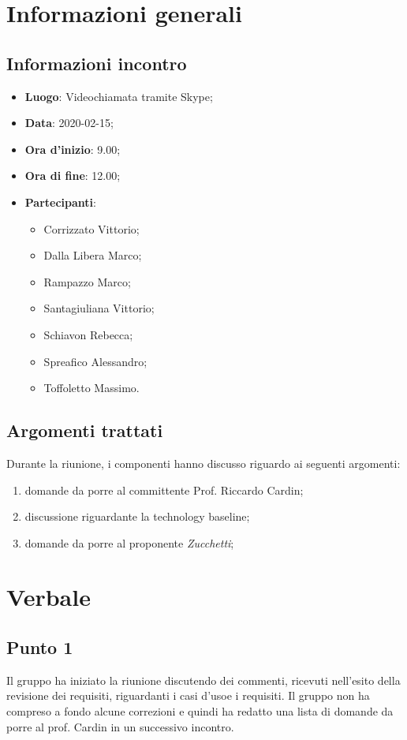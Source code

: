 \section{Informazioni generali}
    \subsection{Informazioni incontro}
        \begin{itemize}
            \item \textbf{Luogo}: Videochiamata tramite Skype;
            \item \textbf{Data}: 2020-02-15;
            \item \textbf{Ora d'inizio}: 9.00;
            \item \textbf{Ora di fine}: 12.00;
            \item \textbf{Partecipanti}: \begin{itemize}
                \item Corrizzato Vittorio;
                \item Dalla Libera Marco;
                \item Rampazzo Marco;
                \item Santagiuliana Vittorio;
                \item Schiavon Rebecca;
                \item Spreafico Alessandro;
                \item Toffoletto Massimo.
            \end{itemize}
        \end{itemize}
    \subsection{Argomenti trattati}
		Durante la riunione, i componenti hanno discusso riguardo ai seguenti argomenti:
        \begin{enumerate}
        	\item domande da porre al committente Prof. Riccardo Cardin;
        	\item discussione riguardante la technology baseline;
            \item domande da porre al proponente \textit{Zucchetti};
        \end{enumerate}
\section{Verbale}
    \subsection{Punto 1}
    	Il gruppo ha iniziato la riunione discutendo dei commenti, ricevuti nell'esito della revisione dei requisiti, riguardanti i casi d'uso\glosp e i requisiti. Il gruppo non ha compreso a fondo alcune correzioni e quindi ha redatto una lista di domande da porre al prof. Cardin in un successivo incontro.
            
